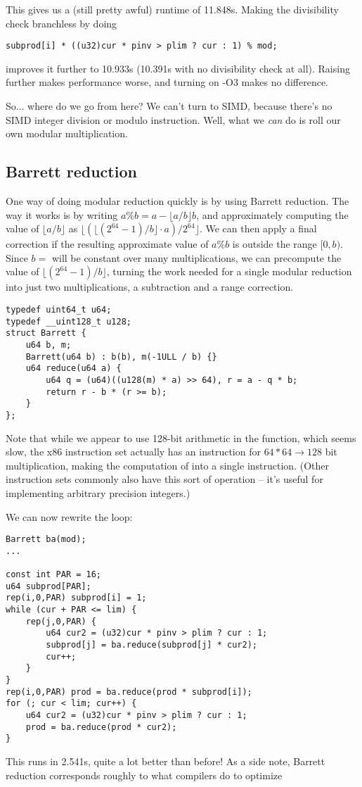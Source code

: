 \documentclass[openany]{book}
\begin{document}
This gives us a (still pretty awful) runtime of 11.848s. Making the divisibility check branchless by doing
\begin{lstlisting}
subprod[i] * ((u32)cur * pinv > plim ? cur : 1) % mod;
\end{lstlisting}
improves it further to 10.933s (10.391s with no divisibility check at all).
Raising \verb@PAR@ further makes performance worse, and turning on -O3 makes no difference.

So... where do we go from here?
We can't turn to SIMD, because there's no SIMD integer division or modulo instruction.
Well, what we \emph{can} do is roll our own modular multiplication.

\subsection*{Barrett reduction}
One way of doing modular reduction quickly is by using Barrett reduction.
The way it works is by writing $a \% b = a - \lfloor a / b \rfloor b$, and approximately computing the value of $\lfloor a / b \rfloor$ as $\lfloor (\lfloor (2^{64} - 1) / b \rfloor \cdot a) / 2^{64} \rfloor$.
We can then apply a final correction if the resulting approximate value of $a \% b$ is outside the range $[0, b)$.
Since $b =$ \verb@mode@ will be constant over many multiplications, we can precompute the value of $\lfloor (2^{64} - 1) / b \rfloor$, turning the work needed for a single modular reduction into just two multiplications, a subtraction and a range correction.
\begin{lstlisting}
typedef uint64_t u64;
typedef __uint128_t u128;
struct Barrett {
	u64 b, m;
	Barrett(u64 b) : b(b), m(-1ULL / b) {}
	u64 reduce(u64 a) {
		u64 q = (u64)((u128(m) * a) >> 64), r = a - q * b;
		return r - b * (r >= b);
	}
};
\end{lstlisting}

Note that while we appear to use 128-bit arithmetic in the \verb@reduce@ function, which seems slow, the x86 instruction set actually has an instruction for \mbox{$64*64\rightarrow128$} bit multiplication, making the computation of \verb@q@ into a single instruction.
(Other instruction sets commonly also have this sort of operation -- it's useful for implementing arbitrary precision integers.)

We can now rewrite the loop:
\begin{lstlisting}
Barrett ba(mod);
...

const int PAR = 16;
u64 subprod[PAR];
rep(i,0,PAR) subprod[i] = 1;
while (cur + PAR <= lim) {
	rep(j,0,PAR) {
		u64 cur2 = (u32)cur * pinv > plim ? cur : 1;
		subprod[j] = ba.reduce(subprod[j] * cur2);
		cur++;
	}
}
rep(i,0,PAR) prod = ba.reduce(prod * subprod[i]);
for (; cur < lim; cur++) {
	u64 cur2 = (u32)cur * pinv > plim ? cur : 1;
	prod = ba.reduce(prod * cur2);
}
\end{lstlisting}
This runs in 2.541s, quite a lot better than before! As a side note, Barrett reduction corresponds roughly to what compilers do to optimize \verb@a % b@ where \verb@b@ is a compile-time constant.
\end{document}
